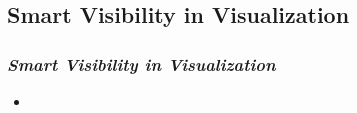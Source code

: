 \subsection{Smart Visibility in Visualization}
\begin{frame}\frametitle{\emph{Smart Visibility in Visualization} \cite{Viola-05-Smart}} 
\begin{itemize}
	\item 
\end{itemize}	
\end{frame}